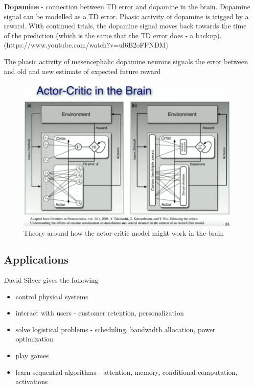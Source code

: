 \documentclass[]{article}
\providecommand{\tightlist}{%
  \setlength{\itemsep}{0pt}\setlength{\parskip}{0pt}}
\begin{document}
\textbf{Dopamine} - connection between TD error and dopamine in the
brain. Dopamine signal can be modelled as a TD error. Phasic activity of
dopamine is trigged by a reward. With continued trials, the dopamine
signal moves back towards the time of the prediction (which is the same
that the TD error does - a backup).
(https://www.youtube.com/watch?v=ul6B2oFPNDM)

The phasic activity of mesencephalic dopamine neurons signals the error
between and old and new estimate of expected future reward

\begin{figure}
\centering
\includegraphics[width=\textwidth,height=0.3\textheight]{./tex2pdf.-4c1708fb449e9e84/44dd1b489d5e060cd9fcd09b66bacb48267e0ca5.png}
\caption{Theory around how the actor-critic model might work in the
brain}
\end{figure}

\hypertarget{applications}{%
\subsection{Applications}\label{applications}}

David Silver gives the following

\begin{itemize}
\tightlist
\item
  control physical systems
\item
  interact with users - customer retention, personalization
\item
  solve logistical problems - scheduling, bandwidth allocation, power
  optimization
\item
  play games
\item
  learn sequential algorithms - attention, memory, conditional
  computation, activations
\end{itemize}
\end{document}

